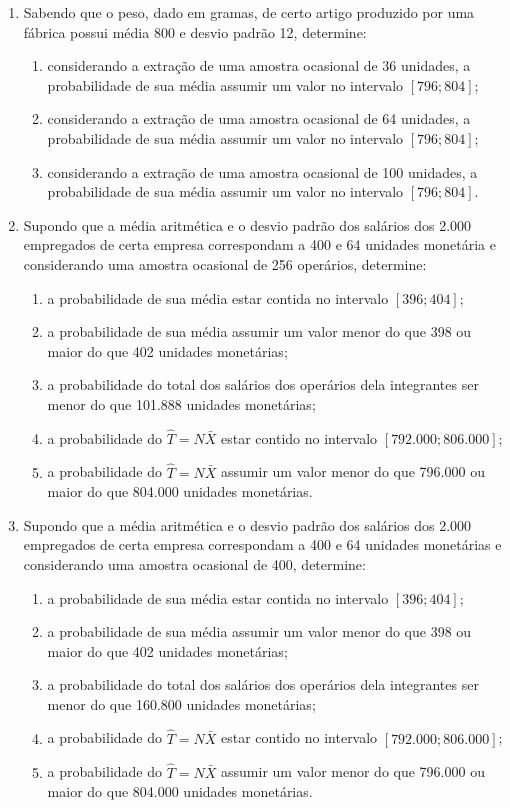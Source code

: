 \begin{enumerate}[resume]
\item Sabendo que o peso, dado em gramas, de certo artigo produzido por uma fábrica possui média 800 e desvio padrão 12, determine:
	\begin{enumerate}
	\item considerando a extração de uma amostra ocasional de 36 unidades, a probabilidade de sua média assumir um valor no intervalo $[796 ; 804]$;
	\item considerando a extração de uma amostra ocasional de 64 unidades, a probabilidade de sua média assumir um valor no intervalo $[796 ; 804]$;
	\item considerando a extração de uma amostra ocasional de 100 unidades, a probabilidade de sua média assumir um valor no intervalo $[796 ; 804]$.
	\end{enumerate}

\item Supondo que a média aritmética e o desvio padrão dos salários dos 2.000 empregados de certa empresa correspondam a 400 e 64 unidades monetária e considerando uma amostra ocasional de 256 operários, determine:
	\begin{enumerate}
	\item a probabilidade de sua média estar contida no intervalo $[396 ; 404]$;
	\item a probabilidade de sua média assumir um valor menor do que 398 ou maior do que 402 unidades monetárias;
	\item a probabilidade do total dos salários dos operários dela integrantes ser menor do que 101.888 unidades monetárias;
	\item a probabilidade do $\hat{T} = N\bar{X}$ estar contido no intervalo $[792.000 ; 806.000]$;
	\item a probabilidade do $\hat{T} = N\bar{X}$ assumir um valor menor do que 796.000 ou maior do que 804.000 unidades monetárias.
	\end{enumerate}
	
\item Supondo que a média aritmética e o desvio padrão dos salários dos 2.000 empregados de certa empresa correspondam a 400 e 64 unidades monetárias e considerando uma amostra ocasional de 400, determine:
	\begin{enumerate}
	\item a probabilidade de sua média estar contida no intervalo $[396 ; 404]$;
	\item a probabilidade de sua média assumir um valor menor do que 398 ou maior do que 402 unidades monetárias;
	\item a probabilidade do total dos salários dos operários dela integrantes ser menor do que 160.800 unidades monetárias;
	\item a probabilidade do $\hat{T} = N\bar{X}$ estar contido no intervalo $[792.000 ; 806.000]$;
	\item a probabilidade do $\hat{T} = N\bar{X}$ assumir um valor menor do que 796.000 ou maior do que 804.000 unidades monetárias.
	\end{enumerate}


\end{enumerate}
